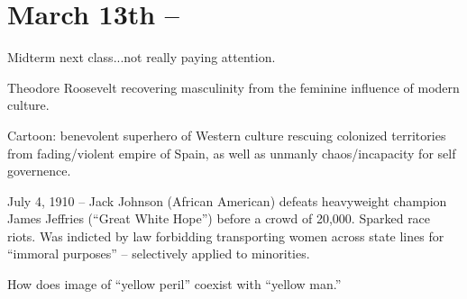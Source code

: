 \section{March 13th -- }

Midterm next class...not really paying attention.

Theodore Roosevelt recovering masculinity from the feminine influence of modern culture.

Cartoon: benevolent superhero of Western culture rescuing colonized territories from fading/violent empire of Spain, as well as unmanly chaos/incapacity for self governence.

July 4, 1910 -- Jack Johnson (African American) defeats heavyweight champion James Jeffries (``Great White Hope'') before a crowd of 20,000. Sparked race riots. Was indicted by law forbidding transporting women across state lines for ``immoral purposes'' -- selectively applied to minorities.

How does image of ``yellow peril'' coexist with ``yellow man.'' 